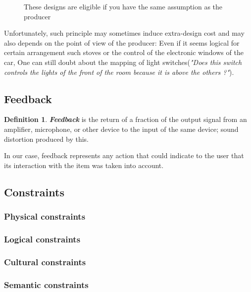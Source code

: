 \documentclass[a4paper,11pt] {article}
\theoremstyle{definition}
\begin{document}
\begin{minipage}{\linewidth}
\begin{minipage}{0.45\linewidth}
\begin{figure}[H]
              \caption{These designs are eligible if you have the same assumption as the producer}
          \end{figure}
      \end{minipage}
  \end{minipage}
  \bigskip
  
  
Unfortunately, such principle may sometimes induce extra-design cost and may also depends on the point of view of the producer: Even if it seems logical for certain arrangement such stoves or the control of the electronic windows of the car, One can still doubt about the mapping of light switches(\textit{"Does this switch controls  the lights of the front of the room because it is above the others ?"}). %
\subsection{Feedback}
\newtheorem{mydef}{Definition}
\begin{mydef}
\textit{\textbf{Feedback}} is the return of a fraction of the output signal from an amplifier, microphone, or other device to the input of the same device; sound distortion produced by this.%
\end{mydef}

In our case, feedback represents any action that could indicate to the user that its interaction with the item was taken into account.



\subsection{Constraints}
\subsubsection{Physical constraints}
\subsubsection{Logical constraints}
\subsubsection{Cultural constraints}
\subsubsection{Semantic constraints}
\end{document}
